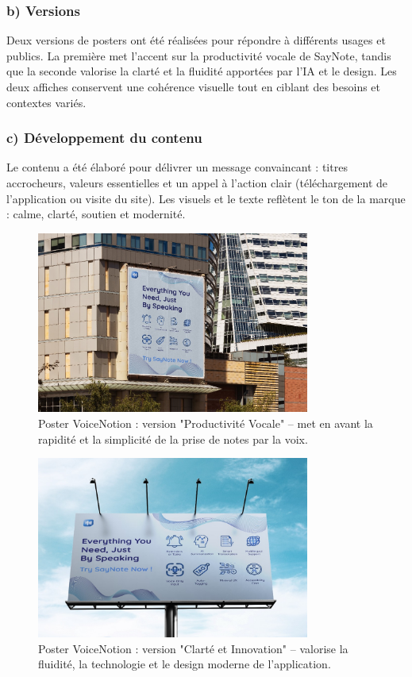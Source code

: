 \subsubsection*{b) Versions}
Deux versions de posters ont été réalisées pour répondre à différents usages et publics. La première met l’accent sur la productivité vocale de SayNote, tandis que la seconde valorise la clarté et la fluidité apportées par l’IA et le design. Les deux affiches conservent une cohérence visuelle tout en ciblant des besoins et contextes variés.

\subsubsection*{c) Développement du contenu}
Le contenu a été élaboré pour délivrer un message convaincant : titres accrocheurs, valeurs essentielles et un appel à l’action clair (téléchargement de l’application ou visite du site). Les visuels et le texte reflètent le ton de la marque : calme, clarté, soutien et modernité.

\begin{figure}[H]
    \centering
    \includegraphics[width=0.8\textwidth]{docs/visual-indentity/pictures/poster2.jpg}
    \caption{Poster VoiceNotion : version "Productivité Vocale" – met en avant la rapidité et la simplicité de la prise de notes par la voix.}
\end{figure}
\begin{figure}[H]
    \centering
    \includegraphics[width=0.8\textwidth]{docs/visual-indentity/pictures/poster.jpg}
    \caption{Poster VoiceNotion : version "Clarté et Innovation" – valorise la fluidité, la technologie et le design moderne de l’application.}
\end{figure}

